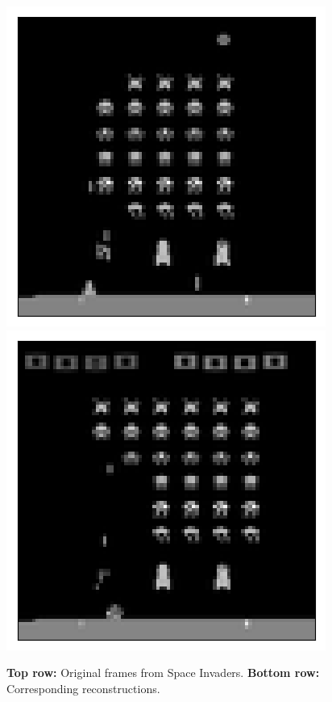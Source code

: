 \begin{figure}[h!]
\begin{multicols}{4}
    \includegraphics[scale=0.4]{figures/results/latent_image/beta_1_sample_2_reconstructed.png}
    \includegraphics[scale=0.4]{figures/results/latent_image/beta_1_sample_3_reconstructed.png}
\end{multicols}
\caption{\textbf{Top row:} Original frames from Space Invaders. \textbf{Bottom row:} Corresponding reconstructions.}
\label{fig:latent_image_originals_and_reconstructions}
\end{figure}


